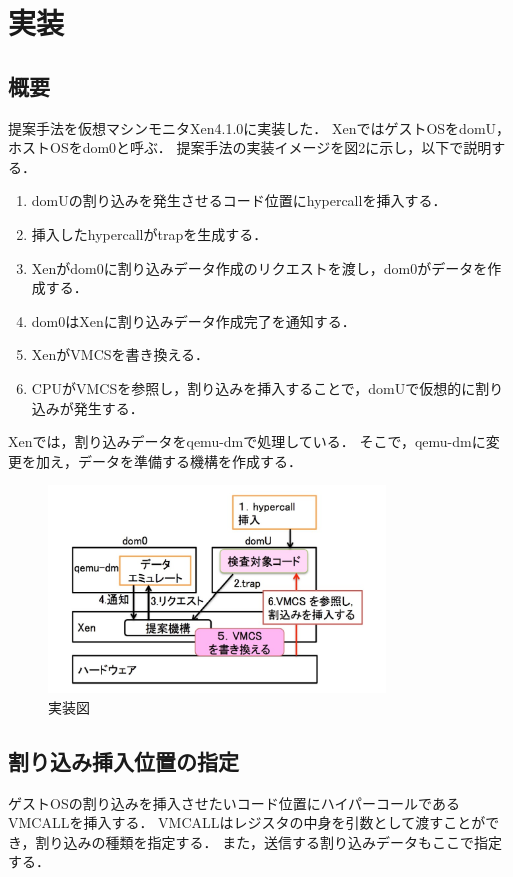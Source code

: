 \documentclass[12pt]{jsarticle}
\begin{document}
\section{実装}
\subsection{概要}
提案手法を仮想マシンモニタXen4.1.0に実装した．
XenではゲストOSをdomU，ホストOSをdom0と呼ぶ．
提案手法の実装イメージを図2に示し，以下で説明する．
\begin{enumerate}
\item domUの割り込みを発生させるコード位置にhypercallを挿入する．
\item 挿入したhypercallがtrapを生成する．
\item Xenがdom0に割り込みデータ作成のリクエストを渡し，dom0がデータを作成する．
\item dom0はXenに割り込みデータ作成完了を通知する．
\item XenがVMCSを書き換える．
\item CPUがVMCSを参照し，割り込みを挿入することで，domUで仮想的に割り込みが発生する．
\end{enumerate}
Xenでは，割り込みデータをqemu-dmで処理している．
そこで，qemu-dmに変更を加え，データを準備する機構を作成する．

\begin{figure}[t]
\begin{center}
\includegraphics[height=5.5cm]{./fig4.jpg}          
\caption{実装図}
\label{fig:up}
\end{center}
\end{figure}


\subsection{割り込み挿入位置の指定}
ゲストOSの割り込みを挿入させたいコード位置にハイパーコールであるVMCALLを挿入する．
VMCALLはレジスタの中身を引数として渡すことができ，割り込みの種類を指定する．
また，送信する割り込みデータもここで指定する．
\end{document}
